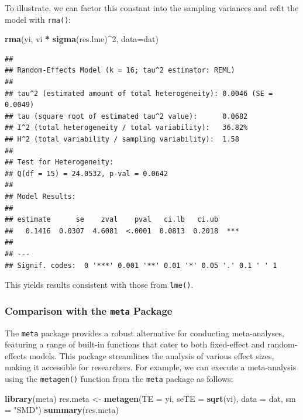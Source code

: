 \documentclass[
]{book}
\newenvironment{Shaded}{\begin{snugshade}}{\end{snugshade}}
\newcommand{\AttributeTok}[1]{\textcolor[rgb]{0.13,0.29,0.53}{#1}}
\newcommand{\DecValTok}[1]{\textcolor[rgb]{0.00,0.00,0.81}{#1}}
\newcommand{\FunctionTok}[1]{\textcolor[rgb]{0.13,0.29,0.53}{\textbf{#1}}}
\newcommand{\NormalTok}[1]{#1}
\newcommand{\OtherTok}[1]{\textcolor[rgb]{0.56,0.35,0.01}{#1}}
\newcommand{\SpecialCharTok}[1]{\textcolor[rgb]{0.81,0.36,0.00}{\textbf{#1}}}
\newcommand{\StringTok}[1]{\textcolor[rgb]{0.31,0.60,0.02}{#1}}
\begin{document}
To illustrate, we can factor this constant into the sampling variances and refit the model with \texttt{rma()}:

\begin{Shaded}
\begin{Highlighting}[]
\FunctionTok{rma}\NormalTok{(yi, vi }\SpecialCharTok{*} \FunctionTok{sigma}\NormalTok{(res.lme)}\SpecialCharTok{\^{}}\DecValTok{2}\NormalTok{, }\AttributeTok{data=}\NormalTok{dat)}
\end{Highlighting}
\end{Shaded}

\begin{verbatim}
## 
## Random-Effects Model (k = 16; tau^2 estimator: REML)
## 
## tau^2 (estimated amount of total heterogeneity): 0.0046 (SE = 0.0049)
## tau (square root of estimated tau^2 value):      0.0682
## I^2 (total heterogeneity / total variability):   36.82%
## H^2 (total variability / sampling variability):  1.58
## 
## Test for Heterogeneity:
## Q(df = 15) = 24.0532, p-val = 0.0642
## 
## Model Results:
## 
## estimate      se    zval    pval   ci.lb   ci.ub      
##   0.1416  0.0307  4.6081  <.0001  0.0813  0.2018  *** 
## 
## ---
## Signif. codes:  0 '***' 0.001 '**' 0.01 '*' 0.05 '.' 0.1 ' ' 1
\end{verbatim}

This yields results consistent with those from \texttt{lme()}.

\subsubsection{\texorpdfstring{Comparison with the \texttt{meta} Package}{Comparison with the meta Package}}\label{comparison-with-the-meta-package}

The \texttt{meta} package provides a robust alternative for conducting meta-analyses, featuring a range of built-in functions that cater to both fixed-effect and random-effects models. This package streamlines the analysis of various effect sizes, making it accessible for researchers. For example, we can execute a meta-analysis using the \texttt{metagen()} function from the \texttt{meta} package as follows:

\begin{Shaded}
\begin{Highlighting}[]
\FunctionTok{library}\NormalTok{(meta)}
\NormalTok{res.meta }\OtherTok{\textless{}{-}} \FunctionTok{metagen}\NormalTok{(}\AttributeTok{TE =}\NormalTok{ yi, }\AttributeTok{seTE =} \FunctionTok{sqrt}\NormalTok{(vi), }\AttributeTok{data =}\NormalTok{ dat, }\AttributeTok{sm =} \StringTok{"SMD"}\NormalTok{)}
\FunctionTok{summary}\NormalTok{(res.meta)}
\end{Highlighting}
\end{Shaded}
\end{document}
